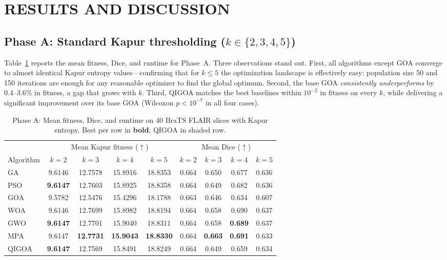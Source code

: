 \section{RESULTS AND DISCUSSION}\label{sec:results}

\subsection{Phase A: Standard Kapur thresholding ($k\in\{2,3,4,5\}$)}

Table~\ref{tab:phaseA} reports the mean fitness, Dice, and runtime for Phase~A. Three observations stand out. First, all algorithms except GOA converge to almost identical Kapur entropy values---confirming that for $k{\le}5$ the optimization landscape is effectively easy: population size 50 and 150 iterations are enough for any reasonable optimizer to find the global optimum. Second, the base GOA \emph{consistently underperforms} by 0.4--3.6\% in fitness, a gap that grows with $k$. Third, QIGOA matches the best baselines within $10^{-2}$ in fitness on every $k$, while delivering a significant improvement over its base GOA (Wilcoxon $p < 10^{-7}$ in all four cases).

\begin{table}[!t]
\centering\small
\caption{Phase A: Mean fitness, Dice, and runtime on 40 BraTS FLAIR slices with Kapur entropy. Best per row in \textbf{bold}; QIGOA in shaded row.}\label{tab:phaseA}
\begin{tabular}{lcccccccc}
\toprule
& \multicolumn{4}{c}{Mean Kapur fitness ($\uparrow$)} & \multicolumn{4}{c}{Mean Dice ($\uparrow$)} \\
\cmidrule(lr){2-5}\cmidrule(lr){6-9}
Algorithm & $k{=}2$ & $k{=}3$ & $k{=}4$ & $k{=}5$ & $k{=}2$ & $k{=}3$ & $k{=}4$ & $k{=}5$ \\
\midrule
GA   & 9.6146 & 12.7578 & 15.8916 & 18.8353 & 0.664 & 0.650 & 0.677 & 0.636 \\
PSO  & \textbf{9.6147} & 12.7603 & 15.8925 & 18.8358 & 0.664 & 0.649 & 0.682 & 0.636 \\
GOA  & 9.5782 & 12.5476 & 15.4296 & 18.1788 & 0.663 & 0.646 & 0.634 & 0.607 \\
WOA  & 9.6146 & 12.7699 & 15.8982 & 18.8194 & 0.664 & 0.658 & 0.690 & 0.637 \\
GWO  & \textbf{9.6147} & 12.7701 & 15.9040 & 18.8311 & 0.664 & 0.658 & \textbf{0.689} & 0.637 \\
MPA  & 9.6147 & \textbf{12.7731} & \textbf{15.9043} & \textbf{18.8330} & 0.664 & \textbf{0.663} & \textbf{0.691} & 0.633 \\
\rowcolor{gray!15}
QIGOA & \textbf{9.6147} & 12.7569 & 15.8491 & 18.8249 & 0.664 & 0.649 & 0.659 & 0.634 \\
\bottomrule
\end{tabular}
\end{table}

